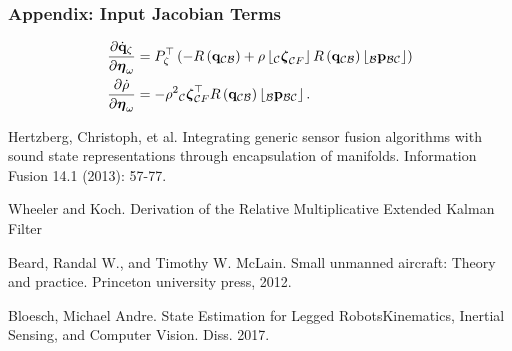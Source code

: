 \documentclass{beamer}
\begin{document}
\begin{frame}
\frametitle{Appendix: Input Jacobian Terms}
\begin{align}
\dfrac{\partial\dot{{\bf q}}_{\zeta}}{\partial\boldsymbol{\eta}_{\omega}} & =P_{\zeta}^{\top}\left(-R\left({\bf q}_{\mathcal{C}\mathcal{B}}\right)+\rho\left\lfloor _{\mathcal{C}}\boldsymbol{\zeta}_{\mathcal{C}F}\right\rfloor R\left({\bf q}_{\mathcal{C}\mathcal{B}}\right)\left\lfloor _{\mathcal{B}}{\bf p}_{\mathcal{B}\mathcal{C}}\right\rfloor \right)\\
\dfrac{\partial\dot{\rho}}{\partial\boldsymbol{\eta}_{\omega}} & =-\rho^{2}{}_{\mathcal{C}}\boldsymbol{\zeta}_{\mathcal{C}F}^{\top}R\left({\bf q}_{\mathcal{C}\mathcal{B}}\right)\left\lfloor _{\mathcal{B}}{\bf p}_{\mathcal{B}\mathcal{C}}\right\rfloor .
\end{align}
\end{frame}





 


\begin{thebibliography}{1}
Hertzberg, Christoph, et al. Integrating
generic sensor fusion algorithms with sound state representations
through encapsulation of manifolds. Information Fusion
14.1 (2013): 57-77.

Wheeler and Koch. Derivation of the
Relative Multiplicative Extended Kalman Filter

Beard, Randal W., and Timothy W. McLain. Small
unmanned aircraft: Theory and practice. Princeton university
press, 2012.

Bloesch, Michael Andre. State Estimation for Legged
Robots\textendash Kinematics, Inertial Sensing, and Computer Vision.
Diss. 2017.\end{thebibliography}
\end{document}
